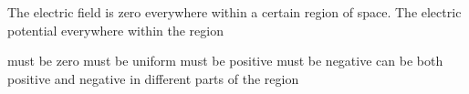 \begin{questions}\setcounter{question}{26}\question
The electric field is zero everywhere within a certain region of space. The electric potential everywhere within the region

\begin{choices}
\choice must be zero
\choice must be uniform
\choice must be positive
\choice must be negative
\choice can be both positive and negative in different parts of the region
\end{choices}\end{questions}
